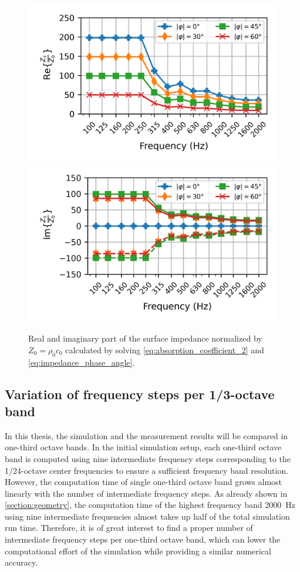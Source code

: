 {\begin{figure}[H]
	\centering
	\includegraphics{fig/chap4/impedance/impedance_real.png}
	\includegraphics{fig/chap4/impedance/impedance_imag.png}
	\caption{Real and imaginary part of the surface impedance normalized by $Z_0 = \rho_0 c_0$ calculated by solving \cref{eq:absorption_coefficient_2} and \cref{eq:impedance_phase_angle}.}
	\label{fig:input_impedance}
\end{figure}

\newpage
\subsection{Variation of frequency steps per 1/3-octave band}

In this thesis, the simulation and the measurement results will be compared in one-third octave bands.
In the initial simulation setup, each one-third octave band is computed using nine intermediate frequency steps corresponding to the 1/24-octave center frequencies to ensure a sufficient frequency band resolution.
However, the computation time of single one-third octave band grows almost linearly with the number of intermediate frequency steps.
As already shown in \cref{section:geometry}, the computation time of the highest frequency band \SI{2000}{Hz} using nine intermediate frequencies almost takes up half of the total simulation run time.
Therefore, it is of great interest to find a proper number of intermediate frequency steps per one-third octave band, which can lower the computational effort of the simulation while providing a similar numerical accuracy.

}
